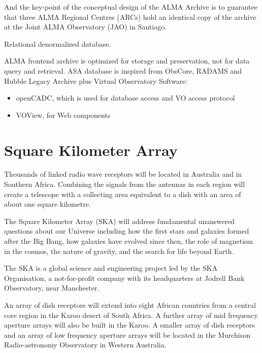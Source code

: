 And the key-point of the conceptual design of the ALMA Archive is to guarantee that three ALMA Regional Centres (ARCs) hold an identical copy of the archive at the Joint ALMA Observatory (JAO) in Santiago. 

Relational denormalized database.

ALMA frontend archive is optimized for storage and preservation, not for data query and retrieval. ASA database is inspired from ObsCore, RADAMS and Hubble Legacy Archive plus Virtual Observatory Software:

\begin{itemize}
\item openCADC, which is used for database access and VO access protocol
\item VOView, for Web components
\end{itemize}




\section{Square Kilometer Array}

Thousands of linked radio wave receptors will be located in Australia and in Southern Africa. Combining the signals from the antennas in each region will create a telescope with a collecting area equivalent to a dish with an area of about one square kilometre.  \newline

The Square Kilometer Array (SKA) will address fundamental unanswered questions about our Universe including how the first stars and galaxies formed after the Big Bang, how galaxies have evolved since then, the role of magnetism in the cosmos, the nature of gravity, and the search for life beyond Earth.  \newline

The SKA is a global science and engineering project led by the SKA Organisation, a not-for-profit company with its headquarters at Jodrell Bank Observatory, near Manchester.  \newline

An array of dish receptors will extend into eight African countries from a central core region in the Karoo desert of South Africa. A further array of mid frequency aperture arrays will also be built in the Karoo. A smaller array of dish receptors and an array of low frequency aperture arrays will be located in the Murchison Radio-astronomy Observatory in Western Australia. \newline

